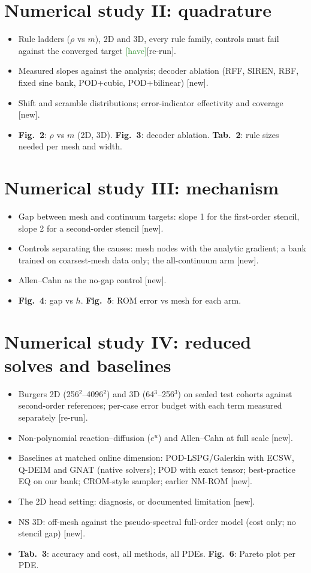 \documentclass[11pt]{article}
\newcommand{\have}{\textsf{\small\textcolor{ForestGreen}{[have]}}}
\newcommand{\rerun}{\textsf{\small\textcolor{BurntOrange}{[re-run]}}}
\newcommand{\new}{\textsf{\small\textcolor{BrickRed}{[new]}}}
\newcommand{\fig}[1]{\textbf{Fig.~#1}}
\newcommand{\tab}[1]{\textbf{Tab.~#1}}
\begin{document}
\section{Numerical study II: quadrature}
\begin{itemize}
\item Rule ladders ($\rho$ vs $m$), 2D and 3D, every rule family, controls must fail against the converged target \have\rerun.
\item Measured slopes against the analysis; decoder ablation (RFF, SIREN, RBF, fixed sine bank, POD+cubic, POD+bilinear) \new.
\item Shift and scramble distributions; error-indicator effectivity and coverage \new.
\item \fig{2}: $\rho$ vs $m$ (2D, 3D). \fig{3}: decoder ablation. \tab{2}: rule sizes needed per mesh and width.
\end{itemize}

\section{Numerical study III: mechanism}
\begin{itemize}
\item Gap between mesh and continuum targets: slope 1 for the first-order stencil, slope 2 for a second-order stencil \new.
\item Controls separating the causes: mesh nodes with the analytic gradient; a bank trained on coarsest-mesh data only; the all-continuum arm \new.
\item Allen--Cahn as the no-gap control \new.
\item \fig{4}: gap vs $h$. \fig{5}: ROM error vs mesh for each arm.
\end{itemize}

\section{Numerical study IV: reduced solves and baselines}
\begin{itemize}
\item Burgers 2D (256$^2$--4096$^2$) and 3D (64$^3$--256$^3$) on sealed test cohorts against second-order references; per-case error budget with each term measured separately \rerun.
\item Non-polynomial reaction--diffusion ($e^u$) and Allen--Cahn at full scale \new.
\item Baselines at matched online dimension: POD-LSPG/Galerkin with ECSW, Q-DEIM and GNAT (native solvers); POD with exact tensor; best-practice EQ on our bank; CROM-style sampler; earlier NM-ROM \new.
\item The 2D head setting: diagnosis, or documented limitation \new.
\item NS 3D: off-mesh against the pseudo-spectral full-order model (cost only; no stencil gap) \new.
\item \tab{3}: accuracy and cost, all methods, all PDEs. \fig{6}: Pareto plot per PDE.
\end{itemize}
\end{document}
